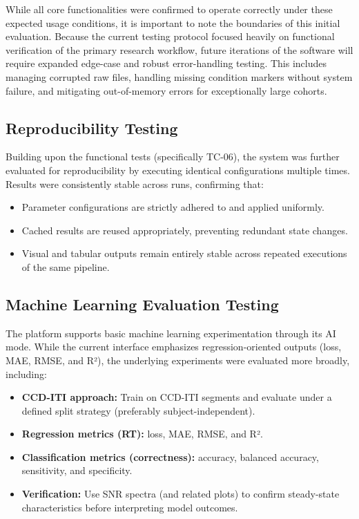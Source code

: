 While all core functionalities were confirmed to operate correctly under these expected usage conditions, it is important to note the boundaries of this initial evaluation. Because the current testing protocol focused heavily on functional verification of the primary research workflow, future iterations of the software will require expanded edge-case and robust error-handling testing. This includes managing corrupted raw files, handling missing condition markers without system failure, and mitigating out-of-memory errors for exceptionally large cohorts.

\subsection{Reproducibility Testing}
\label{sec:reproducibility-testing}

Building upon the functional tests (specifically TC-06), the system was further evaluated for reproducibility by executing identical configurations multiple times. Results were consistently stable across runs, confirming that:

\begin{itemize}
    \item Parameter configurations are strictly adhered to and applied uniformly.
    \item Cached results are reused appropriately, preventing redundant state changes.
    \item Visual and tabular outputs remain entirely stable across repeated executions of the same pipeline.
\end{itemize}

\subsection{Machine Learning Evaluation Testing}
\label{sec:machine-learning-evaluation-testing}

The platform supports basic machine learning experimentation through its AI mode.
While the current interface emphasizes regression-oriented outputs (loss, MAE, RMSE, and R²), the underlying experiments were evaluated more broadly, including:

\begin{itemize}
	\item \textbf{CCD-ITI approach:} Train on CCD-ITI segments and evaluate under a defined split strategy (preferably subject-independent).
	\item \textbf{Regression metrics (RT):} loss, MAE, RMSE, and R².
	\item \textbf{Classification metrics (correctness):} accuracy, balanced accuracy, sensitivity, and specificity.
	\item \textbf{Verification:} Use SNR spectra (and related plots) to confirm steady-state characteristics before interpreting model outcomes.
\end{itemize}

